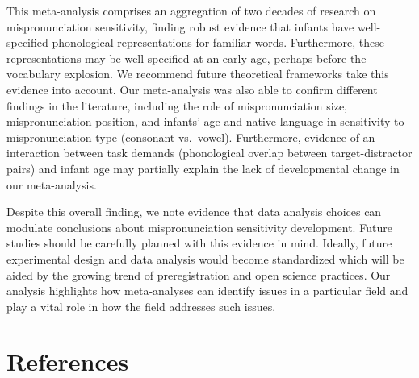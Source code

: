 \documentclass[
  english,
  man, noextraspace]{apa6}
\begin{document}
This meta-analysis comprises an aggregation of two decades of research on mispronunciation sensitivity, finding robust evidence that infants have well-specified phonological representations for familiar words. Furthermore, these representations may be well specified at an early age, perhaps before the vocabulary explosion. We recommend future theoretical frameworks take this evidence into account. Our meta-analysis was also able to confirm different findings in the literature, including the role of mispronunciation size, mispronunciation position, and infants' age and native language in sensitivity to mispronunciation type (consonant vs.~vowel). Furthermore, evidence of an interaction between task demands (phonological overlap between target-distractor pairs) and infant age may partially explain the lack of developmental change in our meta-analysis.

Despite this overall finding, we note evidence that data analysis choices can modulate conclusions about mispronunciation sensitivity development. Future studies should be carefully planned with this evidence in mind. Ideally, future experimental design and data analysis would become standardized which will be aided by the growing trend of preregistration and open science practices. Our analysis highlights how meta-analyses can identify issues in a particular field and play a vital role in how the field addresses such issues.

\newpage

\hypertarget{references}{%
\section{References}\label{references}}

\begingroup
\setlength{\parindent}{-0.5in}
\setlength{\leftskip}{0.5in}
\end{document}
